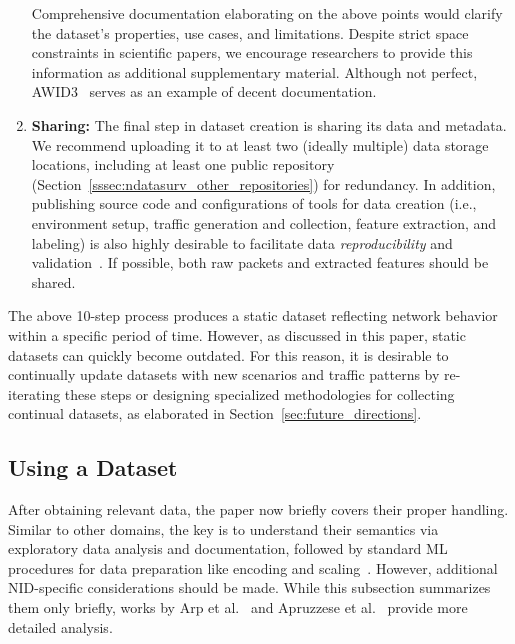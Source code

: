 \begin{enumerate}[nosep, label=\textbf{\arabic*}., topsep=0pt, wide, labelindent=\parindent, itemsep=0pt, parsep=0pt]
Comprehensive documentation elaborating on the above points would clarify the dataset's properties, use cases, and limitations. Despite strict space constraints in scientific papers, we encourage researchers to provide this information as additional supplementary material. Although not perfect, AWID3~\cite{chatzoglou2021_awid3_dataset} serves as an example of decent documentation.

\item \textbf{Sharing:} The final step in dataset creation is sharing its data and metadata. We recommend uploading it to at least two (ideally multiple) data storage locations, including at least one public repository (Section~\ref{sssec:ndatasurv_other_repositories}) for redundancy. In addition, publishing source code and configurations of tools for data creation (i.e., environment setup, traffic generation and collection, feature extraction, and labeling) is also highly desirable to facilitate data \emph{reproducibility} and validation~\cite{lewandowski2023_guidelines_nids_datasets}. If possible, both raw packets and extracted features should be shared.
\end{enumerate}

The above 10-step process produces a static dataset reflecting network behavior within a specific period of time. However, as discussed in this paper, static datasets can quickly become outdated. For this reason, it is desirable to continually update datasets with new scenarios and traffic patterns by re-iterating these steps or designing specialized methodologies for collecting continual datasets, as elaborated in Section~\ref{sec:future_directions}.

\subsection{Using a Dataset}
\label{ssec:recommendations_usage}

After obtaining relevant data, the paper now briefly covers their proper handling. Similar to other domains, the key is to understand their semantics via exploratory data analysis and documentation, followed by standard ML procedures for data preparation like encoding and scaling~\cite{garcia2014_data_preprocessing}. However, additional NID-specific considerations should be made. While this subsection summarizes them only briefly, works by Arp et al.~\cite{arp2022_dos_donts_ml_security} and Apruzzese et al.~\cite{apruzzese2023_sok_pragmatic} provide more detailed analysis.

